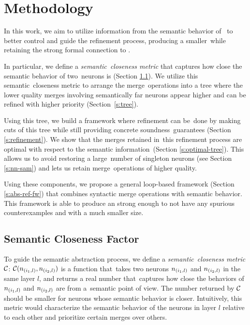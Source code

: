 \section{Methodology}

In this work, we aim to utilize information from the semantic behavior of \cnc to better control and guide the refinement process, producing a smaller \abs while retaining the strong formal connection to \abs.




In particular, we define a \textit{semantic closeness metric} that captures how close the semantic behavior of two neurons is (Section \ref{s:semantic-closeness}). We utilize this semantic closeness metric to arrange the merge operations into a tree where the lower quality merges involving semantically far
neurons appear higher and can be refined with higher priority (Section \ref{s:tree}).




Using this tree, we build a framework where refinement can be done by making cuts of this tree while still providing concrete soundness guarantees (Section \ref{s:refinement}). We show that the merges retained in this refinement process are optimal with respect to the semantic information (Section \ref{s:optimal-tree}). This allows us to avoid restoring a large number of singleton neurons (see Section \ref{s:nn-sam}) and lets us retain merge operations of higher quality.




Using these components, we propose a general \cegar loop-based framework (Section \ref{s:abs-ref-fw}) that combines syntactic merge operations with semantic behavior. This framework is able to produce an \abs strong enough to not have any spurious counterexamples and with a much smaller size.




\subsection{Semantic Closeness Factor}
\label{s:semantic-closeness}




To guide the semantic abstraction process, we define a \emph{semantic closeness metric} $\mathcal{C}$: $\mathcal{C}(n_{(i_1,l)}, n_{(i_2,l)})$ is a function that takes two neurons $n_{(i_1,l)}$ and $n_{(i_2,l)}$ in
the same layer $l$, and returns a real number that captures how close the behaviors of $n_{(i_1,l)}$ and $n_{(i_2,l)}$ are from a semantic point of view. The number returned by $\mathcal{C}$ should be smaller for
neurons whose semantic behavior is closer. Intuitively, this metric would characterize the semantic behavior of the neurons in layer $l$ relative to each other and prioritize certain merges over others.




